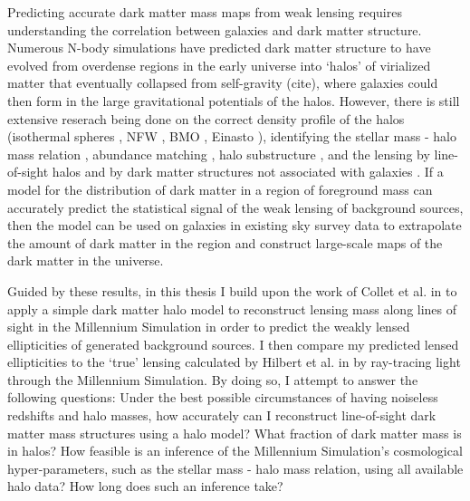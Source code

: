 \documentclass[%
 reprint,
 amsmath,amssymb,
 aps,nofootinbib
]{revtex4-1}
\begin{document}
Predicting accurate dark matter mass maps from weak lensing requires understanding the correlation between galaxies and dark matter structure. Numerous N-body simulations have predicted dark matter structure to have evolved from overdense regions in the early universe into `halos' of virialized matter that eventually collapsed from self-gravity (cite), where galaxies could then form in the large gravitational potentials of the halos. However, there is still extensive reserach being done on the correct density profile of the halos (isothermal spheres \cite{isothermal_spheres}, NFW \cite{nfw}, BMO \cite{bmo}, Einasto \cite{einasto}), identifying the stellar mass - halo mass relation \cite{smhr}, abundance matching \cite{reddick}, halo substructure \cite{substructure}, and the lensing by line-of-sight halos \cite{collet} and by dark matter structures not associated with galaxies \cite{mccully}. If a model for the distribution of dark matter in a region of foreground mass can accurately predict the statistical signal of the weak lensing of background sources, then the model can be used on galaxies in existing sky survey data to extrapolate the amount of dark matter in the region and construct large-scale maps of the dark matter in the universe.

Guided by these results, in this thesis I build upon the work of Collet et al. in \cite{collet} to apply a simple dark matter halo model to reconstruct lensing mass along lines of sight in the Millennium Simulation in order to predict the weakly lensed ellipticities of generated background sources. I then compare my predicted lensed ellipticities to the `true' lensing calculated by Hilbert et al. in \cite{ray_tracing} by ray-tracing light through the Millennium Simulation. By doing so, I attempt to answer the following questions: Under the best possible circumstances of having noiseless redshifts and halo masses, how accurately can I reconstruct line-of-sight dark matter mass structures using a halo model? What fraction of dark matter mass is in halos? How feasible is an inference of the Millennium Simulation's cosmological hyper-parameters, such as the stellar mass - halo mass relation, using all available halo data? How long does such an inference take?

\end{document}
